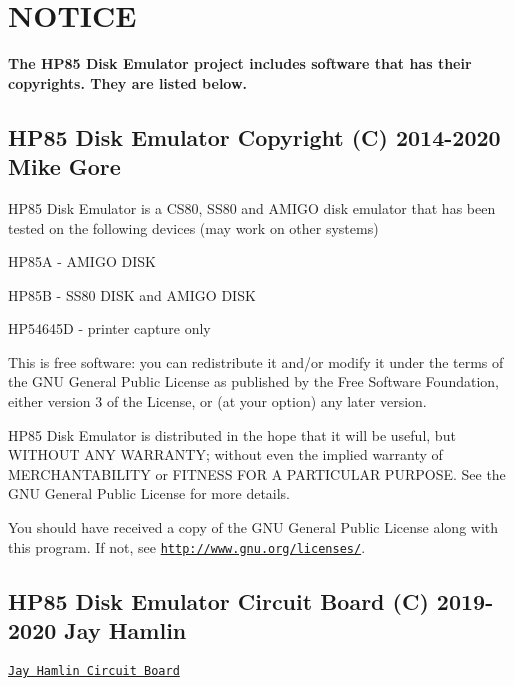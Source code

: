 \hypertarget{index_COPYRIGHT}{}\section{N\+O\+T\+I\+CE}\label{index_COPYRIGHT}
{\bfseries The H\+P85 Disk Emulator project includes software that has their copyrights. They are listed below.}





\subsection*{H\+P85 Disk Emulator Copyright (C) 2014-\/2020 Mike Gore}

H\+P85 Disk Emulator is a C\+S80, S\+S80 and A\+M\+I\+GO disk emulator that has been tested on the following devices (may work on other systems)
\begin{DoxyItemize}
\item H\+P85A -\/ A\+M\+I\+GO D\+I\+SK
\item H\+P85B -\/ S\+S80 D\+I\+SK and A\+M\+I\+GO D\+I\+SK
\item H\+P54645D -\/ printer capture only
\end{DoxyItemize}

This is free software\+: you can redistribute it and/or modify it under the terms of the G\+NU General Public License as published by the Free Software Foundation, either version 3 of the License, or (at your option) any later version.

H\+P85 Disk Emulator is distributed in the hope that it will be useful, but W\+I\+T\+H\+O\+UT A\+NY W\+A\+R\+R\+A\+N\+TY; without even the implied warranty of M\+E\+R\+C\+H\+A\+N\+T\+A\+B\+I\+L\+I\+TY or F\+I\+T\+N\+E\+SS F\+OR A P\+A\+R\+T\+I\+C\+U\+L\+AR P\+U\+R\+P\+O\+SE. See the G\+NU General Public License for more details.

You should have received a copy of the G\+NU General Public License along with this program. If not, see \href{http://www.gnu.org/licenses/}{\tt http\+://www.\+gnu.\+org/licenses/}.



 \subsection*{H\+P85 Disk Emulator Circuit Board (C) 2019-\/2020 Jay Hamlin}


\begin{DoxyItemize}
\item \href{board/V2}{\tt Jay Hamlin Circuit Board} 


\end{DoxyItemize}

